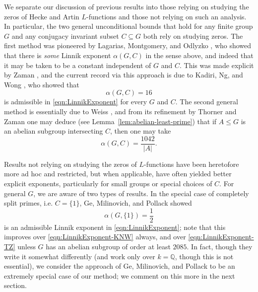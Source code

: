 \documentclass[12pt]{amsart}
\theoremstyle{definition} \newtheorem{definition}[theorem]{Definition}
\theoremstyle{example} \newtheorem{example}[theorem]{Example}
\theoremstyle{remark} \newtheorem{remark}{Remark}[theorem]
\numberwithin{equation}{section}
\numberwithin{theorem}{section}
\renewcommand{\leq}{\leqslant}
\begin{document}
	We separate our discussion of previous results into those relying on studying the zeros of Hecke and Artin $L$-functions and those not relying on such an analysis.  In particular, the two general unconditional bounds that hold for any finite group $G$ and any conjugacy invariant subset $C \subseteq G$ both rely on studying zeros.  The first method was pioneered by Lagarias, Montgomery, and Odlyzko \cite{LagariasMontgomeryOdlyzko-LeastPrime}, who showed that there is \emph{some} Linnik exponent $\alpha(G,C)$ in the sense above, and indeed that it may be taken to be a constant independent of $G$ and $C$.  This was made explicit by Zaman \cite{Zaman-Least}, and the current record via this approach is due to Kadiri, Ng, and Wong \cite{KadiriNgWong-LeastPrime}, who showed that
	\begin{equation}
		\label{eqn:LinnikExponent-KNW}
		\alpha(G,C) = 16
	\end{equation}
	is admissible in \eqref{eqn:LinnikExponent} for every $G$ and $C$.  The second general method is essentially due to Weiss \cite{Weiss}, and from its refinement by Thorner and Zaman \cite{ThornerZaman-Explicit} one may deduce (see Lemma~\ref{lem:abelian-least-prime}) that if $A \leq G$ is an abelian subgroup intersecting $C$, then one may take
	\begin{equation}
		\label{eqn:LinnikExponent-TZ}
		\alpha(G,C) = \frac{1042}{|A|}.
	\end{equation}

	Results not relying on studying the zeros of $L$-functions have been heretofore more ad hoc and restricted, but when applicable, have often yielded better explicit exponents, particularly for small groups or special choices of $C$.  For general $G$, we are aware of two types of results.  In the special case of completely split primes, i.e. $C = \{1\}$, Ge, Milinovich, and Pollack \cite{GeMilinovichPollack-Split} showed
	\begin{equation} \label{eqn:LinnikExponent-GMP}
		\alpha(G,\{1\}) = \frac{1}{2} 
	\end{equation}
	is an admissible Linnik exponent in \eqref{eqn:LinnikExponent}; note that this improves over \eqref{eqn:LinnikExponent-KNW} always, and over \eqref{eqn:LinnikExponent-TZ} unless $G$ has an abelian subgroup of order at least $2085$.  
	In fact, though they write it somewhat differently (and work only over $k=\mathbb{Q}$, though this is not essential), we consider the approach of Ge, Milinovich, and Pollack to be an extremely special case of our method; we comment on this more in the next section.
	
\end{document}
